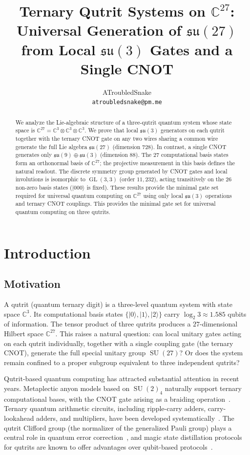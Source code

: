 \documentclass[12pt,a4paper]{article}
\title{Ternary Qutrit Systems on $\mathbb{C}^{27}$: Universal Generation of $\mathfrak{su}(27)$ from Local $\mathfrak{su}(3)$ Gates and a Single CNOT}
\author{ATroubledSnake\\\texttt{atroubledsnake@pm.me}}
\date{}
\newcommand{\GL}{\operatorname{GL}}
\newcommand{\SU}{\operatorname{SU}}
\begin{document}
\maketitle

\begin{abstract}
We analyze the Lie-algebraic structure of a three-qutrit quantum system
whose state space is $\mathbb{C}^{27} = \mathbb{C}^3 \otimes \mathbb{C}^3
\otimes \mathbb{C}^3$. We prove that local $\mathfrak{su}(3)$ generators
on each qutrit together with the ternary CNOT gate on any two wires
sharing a common wire generate the full Lie algebra $\mathfrak{su}(27)$
(dimension 728). In contrast, a single CNOT generates only
$\mathfrak{su}(9) \oplus \mathfrak{su}(3)$ (dimension 88). The 27
computational basis states form an orthonormal basis of $\mathbb{C}^{27}$;
the projective measurement in this basis defines the natural readout.
The discrete symmetry group generated by CNOT gates and local involutions
is isomorphic to $\GL(3,3)$ (order $11{,}232$), acting transitively on the
26 non-zero basis states ($|000\rangle$ is fixed). These results provide
the minimal gate set required for universal quantum computing on
$\mathbb{C}^{27}$ using only local $\mathfrak{su}(3)$ operations and
ternary CNOT couplings. This provides the minimal gate set for
universal quantum computing on three qutrits.
\end{abstract}

\section{Introduction}

\subsection{Motivation}

A qutrit (quantum ternary digit) is a three-level quantum system with
state space $\mathbb{C}^3$. Its computational basis states $\{|0\rangle,
|1\rangle, |2\rangle\}$ carry $\log_2 3 \approx 1.585$ qubits of
information. The tensor product of three qutrits produces a
$27$-dimensional Hilbert space $\mathbb{C}^{27}$. This raises a natural
question: can local unitary gates acting on each qutrit individually,
together with a single coupling gate (the ternary CNOT), generate the
full special unitary group $\SU(27)$? Or does the system remain confined
to a proper subgroup equivalent to three independent qutrits?

Qutrit-based quantum computing has attracted substantial attention in
recent years. Metaplectic anyon models based on $\SU(2)_4$ naturally
support ternary computational bases, with the CNOT gate arising as a
braiding operation~\cite{bocharov2016improved,cuietal2015}. Ternary
quantum arithmetic circuits, including ripple-carry adders, carry-lookahead
adders, and multipliers, have been developed
systematically~\cite{ilyas2022ternary,koleTernary,saha2025intermediate}.
The qutrit Clifford group (the normalizer of the generalized Pauli group)
plays a central role in quantum error correction~\cite{gottesman1999},
and magic state distillation protocols for qutrits are known to offer
advantages over qubit-based protocols~\cite{bravyi2005universal}.
\end{document}
